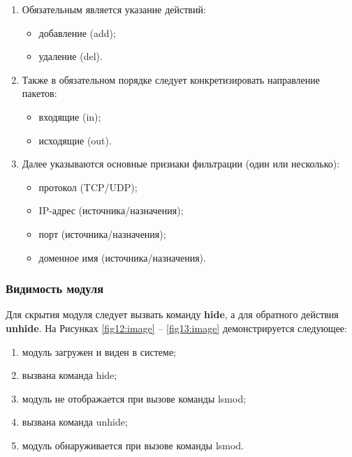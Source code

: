 \begin{enumerate}
	\item Обязательным является указание действий:
	\begin{itemize}
		\item добавление (add);
		
		\item удаление (del).
	\end{itemize}
	
	\item Также в обязательном порядке следует конкретизировать направление пакетов:
	\begin{itemize}
		\item входящие (in);
		
		\item исходящие (out).
	\end{itemize}

	\item Далее указываются основные признаки фильтрации (один или несколько):
	\begin{itemize}
		\item протокол (TCP/UDP);
		
		\item IP-адрес (источника/назначения);
		
		\item порт (источника/назначения);
		
		\item доменное имя (источника/назначения). \newline
	\end{itemize}
	
\end{enumerate}

\subsubsection{Видимость модуля}
Для скрытия модуля следует вызвать команду \textbf{hide}, а для обратного действия \textbf{unhide}. На Рисунках \ref{fig12:image} -- \ref{fig13:image} демонстрируется следующее:
\begin{enumerate}
	\item модуль загружен и виден в системе;
	
	\item вызвана команда hide;
	
	\item модуль не отображается при вызове команды lsmod;
	
	\item вызвана команда unhide;
	
	\item модуль обнаруживается при вызове команды lsmod.
\end{enumerate}

